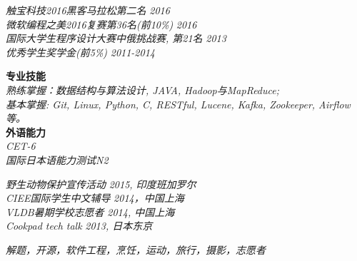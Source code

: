\documentclass{resume}
\newcommand\fs{\CJKfamily{fs}}
\newcommand{\sanhao}{\fontsize{16pt}{\baselineskip}\selectfont}
\newcommand{\sihao}{\fontsize{14pt}{\baselineskip}\selectfont}
\begin{document}
\begin{rSection}{\fs \sanhao {荣誉与证书}}
	\sihao \textit{触宝科技2016黑客马拉松第二名} \hfill {\em 2016} \\
	\sihao \textit{微软编程之美2016复赛第36名(前10\%)} \hfill {\em 2016} \\
	\sihao \textit{国际大学生程序设计大赛中俄挑战赛, 第21名} \hfill {\em 2013} \\
	\sihao \textit{优秀学生奖学金(前5\%)} \hfill {\em 2011-2014} \\
\end{rSection}




\begin{rSection}{\fs \sanhao {技能}}
	\sihao \textbf {专业技能}\\
	\sihao \textit{ 熟练掌握：数据结构与算法设计, JAVA, Hadoop与MapReduce;\\
		基本掌握: Git, Linux, Python, C, RESTful, Lucene, Kafka, Zookeeper, Airflow等。}\\
	
	\sihao \textbf {外语能力}\\
	\sihao \textit{CET-6}\\
	\sihao \textit{国际日本语能力测试N2}\\
\end{rSection}


\begin{rSection}{\fs \sanhao {社会活动}}
\sihao \textit{ 野生动物保护宣传活动} \hfill {\em 2015, 印度班加罗尔} \\
\sihao \textit{CIEE国际学生中文辅导} \hfill {\em 2014，中国上海} \\
\sihao \textit{VLDB暑期学校志愿者} \hfill {\em 2014, 中国上海} \\
\sihao \textit{ Cookpad tech talk} \hfill {\em 2013, 日本东京} 
\end{rSection}

\begin{rSection}{\fs \sanhao { 兴趣爱好}}
	\sihao \textit{ 解题，开源，软件工程，烹饪，运动，旅行，摄影，志愿者} \hfill \\
\end{rSection}
\end{document}
